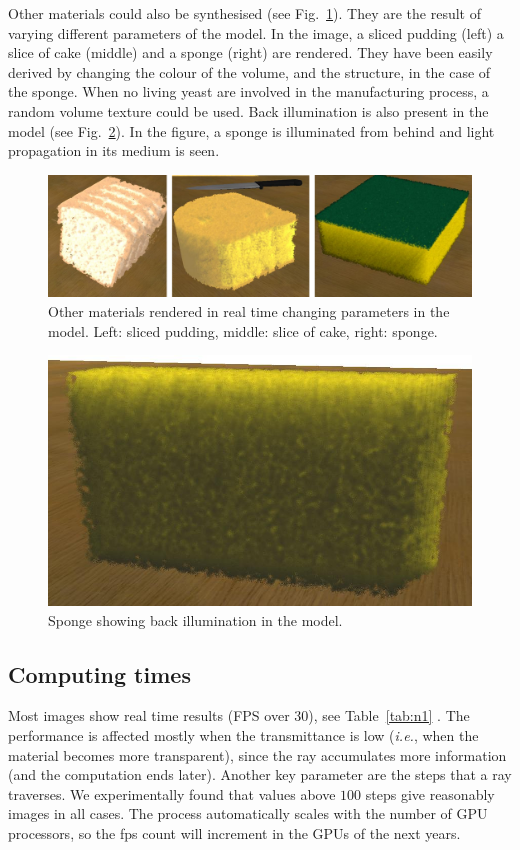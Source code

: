 \documentclass[oneside,a4paper,spanish,links]{amca}
\begin{document}
Other materials could also be synthesised (see
Fig.~\ref{fg:fig6}). They are the result of varying different
parameters of the model. In the image, a sliced pudding (left) a slice
of cake (middle) and a sponge (right) are rendered. They have been
easily derived by changing the colour of the volume, and the structure,
in the case of the sponge. When no living yeast are involved in the
manufacturing process, a random volume texture could be used. Back
illumination is also present in the model (see Fig.~\ref{fg:fig7}). In
the figure, a sponge is illuminated from behind and light propagation
in its medium is seen.

\begin{figure}[htb!]
  \centerline{\includegraphics[scale=0.3]{fig6}}
  \caption{Other materials rendered in real time changing parameters in the model. Left: sliced pudding, middle: slice of cake, right: sponge. }
  \label{fg:fig6}
\end{figure}



\begin{figure}[htb!]
  \centerline{\includegraphics[scale=0.25]{fig7}}
  \caption{Sponge showing back illumination in the model. }
  \label{fg:fig7}
\end{figure}


\subsection{Computing times}
Most images show real time results (FPS over 30), see Table~\ref{tab:n1} . The performance is affected mostly when the transmittance is low ({\em i.e.}, when the material becomes more transparent), since the ray accumulates more information (and the computation ends later). Another key parameter are the steps that a ray traverses. We experimentally found that values above $100$ steps give reasonably images in all cases. The process automatically scales with the number of GPU processors, so the fps count will increment in the GPUs of the next years.
\end{document}
